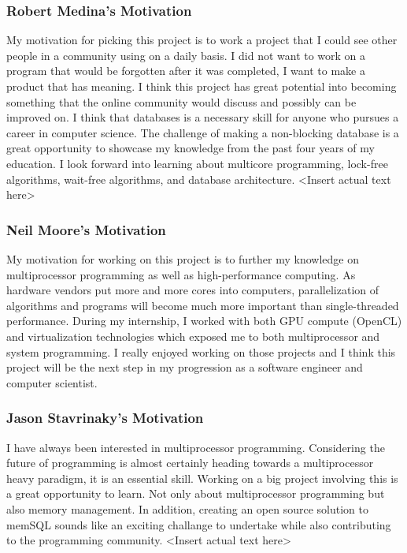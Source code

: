 \documentclass[letterpaper]{article}
\begin{document}
  \subsubsection{Robert Medina's Motivation}
  My motivation for picking this project is to work a project that I could see other people in a community using on a daily basis. I did not want to work on a program that would be 
  forgotten after it was completed, I want to make a product that has meaning. I think this project has great potential into becoming something that the online community would discuss 
  and possibly can be improved on. I think that databases is a necessary skill for anyone who pursues a career in computer science. The challenge of making a non-blocking database is 
  a great opportunity to showcase my knowledge from the past four years of my education. I look forward into learning about multicore programming, lock-free algorithms, wait-free algorithms,
  and database architecture.
  \textless Insert actual text here\textgreater
  \subsubsection{Neil Moore's Motivation}
  My motivation for working on this project is to further my knowledge on multiprocessor programming as well as high-performance computing.  
  As hardware vendors put more and more cores into computers, parallelization of algorithms and programs will become much more important than
  single-threaded performance. During my internship, I worked with both GPU compute (OpenCL) and virtualization technologies which exposed me
  to both multiprocessor and system programming. I really enjoyed working on those projects and I think this project will be the next step 
  in my progression as a software engineer and computer scientist.
  \subsubsection{Jason Stavrinaky's Motivation}
  I have always been interested in multiprocessor programming. Considering the future of programming is almost certainly heading towards a
  multiprocessor heavy paradigm, it is an essential skill. Working on a big project involving this is a great opportunity to learn. Not only
  about multiprocessor programming but also memory management. In addition, creating an open source solution to memSQL sounds like an exciting
  challange to undertake while also contributing to the programming community.
  \textless Insert actual text here\textgreater
  
\end{document}
